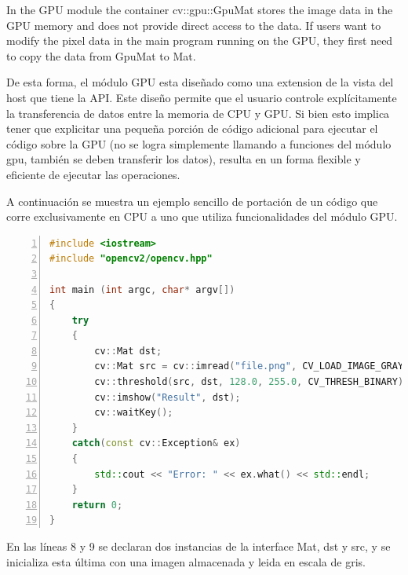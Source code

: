 \documentclass[a4paper,10pt]{report}
\begin{document}
In the GPU module the container cv::gpu::GpuMat stores the image data in the GPU memory and does not provide direct access to the data. If users want to modify the pixel data in the main program running on the GPU, they first need to copy the data from GpuMat to Mat.


De esta forma, el módulo GPU esta diseñado como una extension de la vista del host que tiene la API. Este diseño permite que el usuario controle explícitamente la transferencia de datos entre la memoria de CPU y GPU.
Si bien esto implica tener que explicitar una pequeña porción de código adicional para ejecutar el código sobre la GPU (no se logra simplemente llamando a funciones del módulo gpu, también se deben transferir los datos), resulta en un forma flexible y eficiente de ejecutar las operaciones. 


A continuación se muestra un ejemplo sencillo de portación de un código que corre exclusivamente en CPU a uno que utiliza funcionalidades del módulo GPU.

\begin{lstlisting}[frame=bt,title={aa},caption={Aplicar threshold a imagen en gris - CPU},
columns=fullflexible,numbers=left,backgroundcolor=\color{LemonChiffon1},basicstyle=\footnotesize,keywordstyle=\ttfamily\footnotesize,language=C++,stringstyle=\ttfamily,breaklines=true,xleftmargin=0.5em,xrightmargin=0pt,aboveskip=\bigskipamount,belowskip=\bigskipamount]
#include <iostream>
#include "opencv2/opencv.hpp"

int main (int argc, char* argv[])
{
    try
    {
        cv::Mat dst;
        cv::Mat src = cv::imread("file.png", CV_LOAD_IMAGE_GRAYSCALE);
        cv::threshold(src, dst, 128.0, 255.0, CV_THRESH_BINARY);
        cv::imshow("Result", dst);
        cv::waitKey();
    }
    catch(const cv::Exception& ex)
    {
        std::cout << "Error: " << ex.what() << std::endl;
    }
    return 0;
}

\end{lstlisting}

En las líneas 8 y 9 se declaran dos instancias de la interface Mat, dst y src, y se inicializa esta última con una imagen almacenada y leida en escala de gris.
\end{document}
